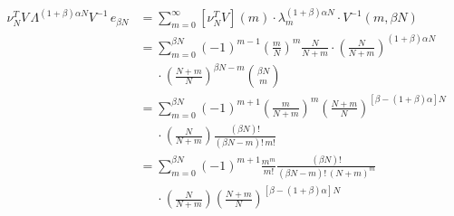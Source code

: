 \documentclass{article}
\newcommand{\ppar}[1]{\left( #1 \right)}
\newcommand{\spar}[1]{\left[ #1 \right]}
\begin{document}
\begin{align*}
    \nu_N^T V\, \Lambda^{(1+\beta) \alpha N} V^{-1}\, e_{\beta N}
    &=
    \sum_{m=0}^\infty 
    \spar{\nu_N^T V}(m)
    \cdot
    \lambda_m^{(1+\beta) \alpha N}
    \cdot
    V^{-1}(m, \beta N)
    \\
    &=
    \sum_{m=0}^{\beta N}
    (-1)^{m-1} \ppar{\frac{m}{N}}^m \frac{N}{N+m} \cdot
    \ppar{\frac{N}{N+m}}^{(1+\beta) \alpha N}
    \\
    &\phantom{=}
    \cdot \ppar{\frac{N+m}{N}}^{\beta N-m} \binom{\beta N}{m}
    \\
    &=
    \sum_{m=0}^{\beta N}
    (-1)^{m+1} 
    \ppar{\frac{m}{N+m}}^m \ppar{\frac{N+m}{N}}^{\spar{\beta-(1+\beta)\alpha} N}
    \\
    &\phantom{=}
    \cdot 
    \ppar{\frac{N}{N+m}} \frac{(\beta N)!}{(\beta N-m)!\, m!}
    \\
    &=
    \sum_{m=0}^{\beta N}
    (-1)^{m+1} 
    \frac{m^m}{m!} \frac{(\beta N)!}{(\beta N-m)!\, (N+m)^m}
    \\
    &\phantom{=}
    \cdot 
    \ppar{\frac{N}{N+m}} \ppar{\frac{N+m}{N}}^{\spar{\beta-(1+\beta)\alpha} N}
\end{align*}


\end{document}
